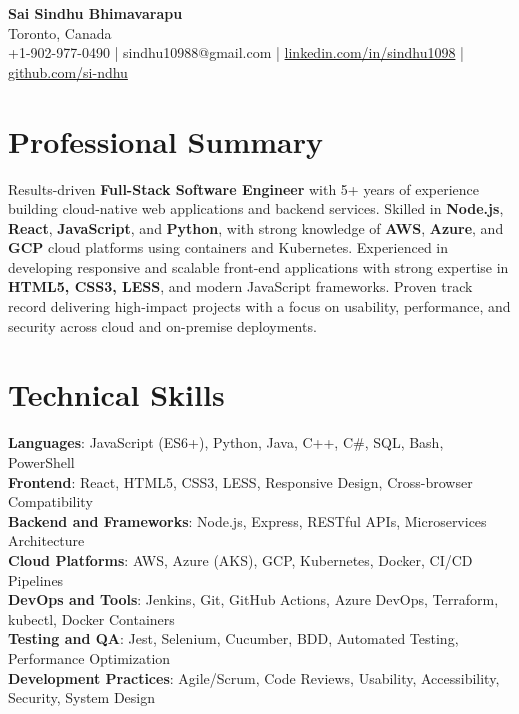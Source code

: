 \documentclass[letterpaper,11pt]{article}
\begin{document}
\begin{center}
  {\Large \textbf{Sai Sindhu Bhimavarapu}} \\
  Toronto, Canada \\
  +1-902-977-0490 \enspace | \enspace sindhu10988@gmail.com \enspace | \enspace \href{https://www.linkedin.com/in/sindhu1098/}{linkedin.com/in/sindhu1098} \enspace | \enspace \href{https://github.com/si-ndhu}{github.com/si-ndhu}
\end{center}

\section{Professional Summary}
  \begin{itemize}[leftmargin=0.15in, label={}]
    \small{\item{
     Results-driven \textbf{Full-Stack Software Engineer} with 5+ years of experience building cloud-native web applications and backend services. Skilled in \textbf{Node.js}, \textbf{React}, \textbf{JavaScript}, and \textbf{Python}, with strong knowledge of \textbf{AWS}, \textbf{Azure}, and \textbf{GCP} cloud platforms using containers and Kubernetes. Experienced in developing responsive and scalable front-end applications with strong expertise in \textbf{HTML5, CSS3, LESS}, and modern JavaScript frameworks. Proven track record delivering high-impact projects with a focus on usability, performance, and security across cloud and on-premise deployments.
    }}
  \end{itemize}
\vspace{-16pt}

\section{Technical Skills}
 \begin{itemize}[leftmargin=0.15in, label={}]
    \small{\item{
     \textbf{Languages}: JavaScript (ES6+), Python, Java, C++, C\#, SQL, Bash, PowerShell \\
     \textbf{Frontend}: React, HTML5, CSS3, LESS, Responsive Design, Cross-browser Compatibility \\
     \textbf{Backend and Frameworks}: Node.js, Express, RESTful APIs, Microservices Architecture \\
     \textbf{Cloud Platforms}: AWS, Azure (AKS), GCP, Kubernetes, Docker, CI/CD Pipelines \\
     \textbf{DevOps and Tools}: Jenkins, Git, GitHub Actions, Azure DevOps, Terraform, kubectl, Docker Containers \\
     \textbf{Testing and QA}: Jest, Selenium, Cucumber, BDD, Automated Testing, Performance Optimization \\
     \textbf{Development Practices}: Agile/Scrum, Code Reviews, Usability, Accessibility, Security, System Design \\
    }}
 \end{itemize}
\vspace{-16pt}
\end{document}
